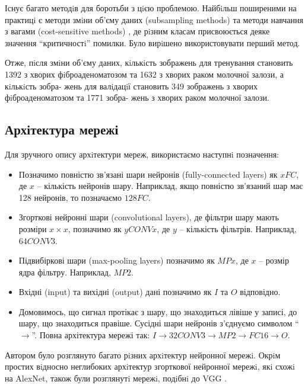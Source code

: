 Існує багато методiв для боротьби з цiєю проблемою. Найбiльш поширеними на практицi є методи змiни об'єму даних (subsampling methods) та методи навчання з вагами (cost-sensitive methods) \citep{nn:imbalance}, де рiзним класам присвоюється деяке значення \enquote{критичностi} помилки. Було вирiшено використовувати перший метод.

Отже, пiсля змiни об'єму даних, кiлькiсть зображень для тренування становить 1392 з хворих фiброаденоматозом та 1632 з хворих раком молочної залози, а кiлькiсть зобра- жень для валiдацiї становить 349 зображень з хворих фiброаденоматозом та 1771 зобра- жень з хворих раком молочної залози.

\subsection{Архітектура мережі}

Для зручного опису архiтектури мереж, використаємо наступнi позначення:

\begin{itemize}
	\item Позначимо повністю зв'язані шари нейронів (fully-connected layers) як \(xFC\), де \(x\) -- кількість нейронів шару. Наприклад, якщо повністю зв'язаний шар має 128 нейронів, то позначаємо \(128FC\).
	
	\item Згорткові нейронні шари (convolutional layers), де фільтри шару мають розміри \(x \times x\), позначимо як \(yCONVx\), де \(y\) -- кількість фільтрів. Наприклад, \(64CONV3\).
	
	\item Підвибіркові шари (max-pooling layers) позначимо як \(MPx\), де \(x\) -- розмір ядра фільтру. Наприклад, \(MP2\).
	
	\item Вхідні (input) та вихідні (output) дані позначимо як \(I\) та \(O\) відповідно.
	
	\item Домовимось, що сигнал протікає з шару, що знаходиться лівіше у записі, до шару, що знаходиться правіше. Сусідні шари нейронів з'єднуємо символом \enquote{\(\rightarrow\)}. Повна архітектура мережі так: \(I \rightarrow 32CONV3 \rightarrow MP2 \rightarrow FC16 \rightarrow O\).
\end{itemize}

Автором було розглянуто багато рiзних архiтектур нейронної мережi. Окрiм простих вiдносно неглибоких архiтектур згорткової нейронної мережi, якi схожi на AlexNet, також були розглянутi мережi, подiбнi до VGG \cite{nn:vgg}.

